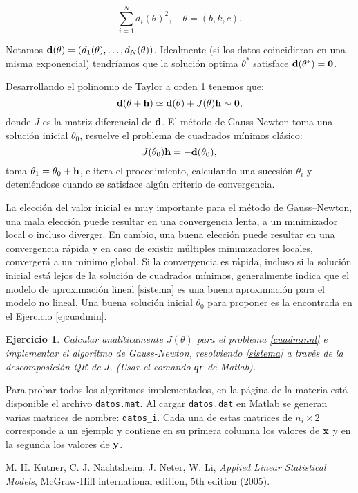 \documentclass[12pt]{article}
\newtheorem{ejer}{Ejercicio}
\newcommand{\bej}{\begin{ejer}\rm}
\newcommand{\fej}{\end{ejer}}
\begin{document}
$$\sum_{i=1}^N d_i(\theta)^2, \quad \theta = (b,k,c).$$

Notamos ${\bf d}(\theta) = (d_1(\theta),\dots,d_N(\theta))$.
Idealmente (si los datos coincidieran en una misma exponencial) tendríamos que la solución optima $\theta^*$ satisface ${\bf d}(\theta^*) = {\bf 0}$.

Desarrollando el polinomio de Taylor a orden 1 tenemos que:
$${\bf d}(\theta+{\bf h}) \simeq {\bf d}(\theta)+J(\theta){\bf h}\sim {\bf 0},$$
donde $J$ es la matriz diferencial de ${\bf d}$. El método de Gauss-Newton toma una solución inicial $\theta_0$, resuelve el problema de cuadrados mínimos clásico:
\begin{equation}\label{sistema}
J(\theta_0){\bf h} = -{\bf d}(\theta_0), 
\end{equation}
toma $\theta_1 = \theta_0 + {\bf h}$, e itera el procedimiento, calculando una sucesión $\theta_i$ y deteniéndose cuando se satisface algún criterio de convergencia. 

La elección del valor inicial es muy importante para el método de Gauss--Newton, una mala elección puede resultar en una convergencia lenta, a un minimizador local o incluso diverger. En cambio, una buena elección puede resultar en una convergencia rápida y en caso de existir múltiples minimizadores locales, convergerá a un mínimo global. Si la convergencia es rápida, incluso si la solución inicial está lejos de la solución de cuadrados mínimos, generalmente indica que el modelo de aproximación lineal \eqref{sistema} es una buena aproximación para el modelo no lineal. Una buena solución inicial $\theta_0$ para proponer es la encontrada en el Ejercicio \ref{ejcuadmin}.


\bej Calcular analíticamente $J(\theta)$ para el problema \eqref{cuadminnl} e implementar el algoritmo de Gauss-Newton, resolviendo \eqref{sistema} a través de la descomposición QR de $J$. (Usar el comando \verb+qr+ de Matlab). \fej



Para probar todos los algoritmos implementados, en la página de la materia está disponible el archivo \verb+datos.mat+. Al cargar \verb+datos.dat+ en Matlab se generan varias matrices de nombre: \verb+datos_i+. Cada una de estas matrices de $n_i\times 2$ corresponde a un ejemplo y contiene en su primera columna los valores de ${\bf x}$ y en la segunda los valores de ${\bf y}$.




\begin{thebibliography}{9}
  M. H. Kutner, C. J. Nachtsheim, J. Neter, W. Li, 
  \emph{Applied Linear Statistical Models},
  {McGraw-Hill international edition},
  5th edition 
  (2005).
  
\end{thebibliography}




 
 
\end{document}
